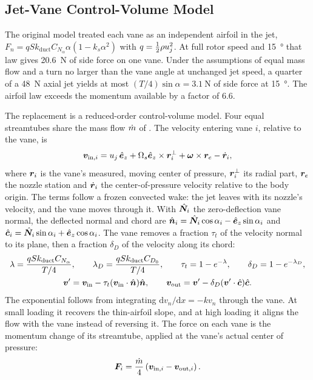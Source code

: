 \documentclass[10pt,letterpaper]{article}
\begin{document}
\subsection{Jet-Vane Control-Volume Model}
\label{sec:vanes}

The original model treated each vane as an independent airfoil in the jet, $F_n = qSk_{\text{duct}}C_{N_\alpha}\alpha(1 - k_s\alpha^2)$ with $q = \tfrac12\rho u_j^2$.
At full rotor speed and \SI{15}{\degree} that law gives \SI{20.6}{\newton} of side force on one vane.
Under the assumptions of equal mass flow and a turn no larger than the vane angle at unchanged jet speed, a quarter of a \SI{48}{\newton} axial jet yields at most $(T/4)\sin\alpha = \SI{3.1}{\newton}$ of side force at \SI{15}{\degree}.
The airfoil law exceeds the momentum available by a factor of 6.6.

The replacement is a reduced-order control-volume model.
Four equal streamtubes share the mass flow $\dot{m}$ of .
The velocity entering vane $i$, relative to the vane, is
\begin{equation}
\bm{v}_{\text{in},i} = u_j\,\hat{\bm{e}}_z + \Omega_s\hat{\bm{e}}_z\times\bm{r}_i^{\perp} + \bm{\omega}\times\bm{r}_e - \dot{\bm{r}}_i ,
\label{eq:inflow}
\end{equation}
where $\bm{r}_i$ is the vane's measured, moving center of pressure, $\bm{r}_i^{\perp}$ its radial part, $\bm{r}_e$ the nozzle station and $\dot{\bm{r}}_i$ the center-of-pressure velocity relative to the body origin.
The terms follow a frozen convected wake: the jet leaves with its nozzle's velocity, and the vane moves through it.
With $\hat{\bm{N}}_i$ the zero-deflection vane normal, the deflected normal and chord are $\hat{\bm{n}}_i = \hat{\bm{N}}_i\cos\alpha_i - \hat{\bm{e}}_z\sin\alpha_i$ and $\hat{\bm{c}}_i = \hat{\bm{N}}_i\sin\alpha_i + \hat{\bm{e}}_z\cos\alpha_i$.
The vane removes a fraction $\tau_t$ of the velocity normal to its plane, then a fraction $\delta_D$ of the velocity along its chord:
\begin{gather}
\lambda = \frac{qSk_{\text{duct}}C_{N_\alpha}}{T/4}, \qquad
\lambda_D = \frac{qSk_{\text{duct}}C_{D_0}}{T/4}, \qquad
\tau_t = 1 - e^{-\lambda}, \qquad \delta_D = 1 - e^{-\lambda_D}, \nonumber\\
\bm{v}' = \bm{v}_{\text{in}} - \tau_t(\bm{v}_{\text{in}}\cdot\hat{\bm{n}})\hat{\bm{n}}, \qquad
\bm{v}_{\text{out}} = \bm{v}' - \delta_D(\bm{v}'\cdot\hat{\bm{c}})\hat{\bm{c}}.
\label{eq:turning}
\end{gather}
The exponential follows from integrating $\mathrm{d}v_n/\mathrm{d}x = -k v_n$ through the vane.
At small loading it recovers the thin-airfoil slope, and at high loading it aligns the flow with the vane instead of reversing it.
The force on each vane is the momentum change of its streamtube, applied at the vane's actual center of pressure:
\begin{equation}
\bm{F}_i = \frac{\dot{m}}{4}\left(\bm{v}_{\text{in},i} - \bm{v}_{\text{out},i}\right).
\label{eq:vaneforce}
\end{equation}
\end{document}
